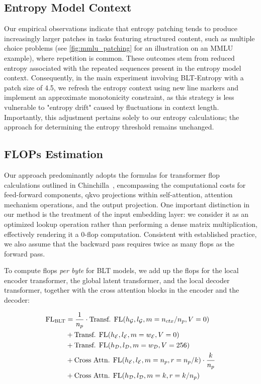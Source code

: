 \subsection{Entropy Model Context}
\label{section:entropy-context}
Our empirical observations indicate that entropy patching tends to produce increasingly larger patches in tasks featuring structured content, such as multiple choice problems (see \autoref{fig:mmlu_patching} for an illustration on an MMLU example), where repetition is common. These outcomes stem from reduced entropy associated with the repeated sequences present in the entropy model context. Consequently, in the main experiment involving {\textsc BLT}-Entropy with a patch size of 4.5, we refresh the entropy context using new line markers and implement an approximate monotonicity constraint, as this strategy is less vulnerable to "entropy drift" caused by fluctuations in context length. Importantly, this adjustment pertains solely to our entropy calculations; the approach for determining the entropy threshold remains unchanged.

\subsection{FLOPs Estimation} 
\label{section:flops}

Our approach predominantly adopts the formulas for transformer flop calculations outlined in Chinchilla~\citep{hoffmann2022training}, encompassing the computational costs for feed-forward components, qkvo projections within self-attention, attention mechanism operations, and the output projection. One important distinction in our method is the treatment of the input embedding layer: we consider it as an optimized lookup operation rather than performing a dense matrix multiplication, effectively rendering it a 0-flop computation. Consistent with established practice, we also assume that the backward pass requires twice as many flops as the forward pass.

To compute flops \textit{per byte} for {\textsc BLT} models, we add up the flops for the local encoder transformer, the global latent transformer, and the local decoder transformer, together with the cross attention blocks in the encoder and the decoder:

\begin{align}
    \text{FL}_{\text{{\textsc BLT}}} &= \frac{1}{n_p} \cdot \text{Transf. FL}(h_{\mathcal{G}}, l_{\mathcal{G}}, m=n_{ctx}/n_p, V=0) \\
    &+ \text{Transf. FL}(h_{\mathcal{E}}, l_{\mathcal{E}}, m=w_{\mathcal{E}}, V=0) \\
    &+ \text{Transf. FL}(h_{\mathcal{D}}, l_{\mathcal{D}}, m=w_{\mathcal{D}}, V=256) \\
    &+ \text{Cross Attn. FL}(h_{\mathcal{E}}, l_{\mathcal{E}}, m=n_p, r=n_p/k) \cdot \frac{k}{n_p} \\
    &+ \text{Cross Attn. FL}(h_{\mathcal{D}}, l_{\mathcal{D}}, m=k, r=k/n_p)
\end{align}

